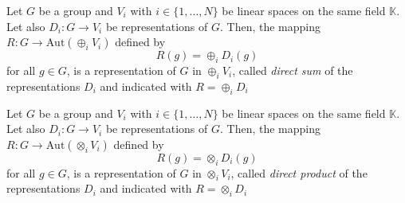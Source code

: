 \begin{proposition}
    Let $G$ be a group and $V_i$ with $i \in \{1, \ldots, N\}$ be linear spaces on the same field $\mathbb{K}$. Let also $D_i: G \rightarrow V_i$ be representations of $G$.
    Then, the mapping $R: G \rightarrow \text{Aut}(\oplus_i V_i)$ defined by
    \begin{equation*}
        R(g) = \oplus_i D_i(g)
    \end{equation*}
    for all $g \in G$, is a representation of $G$ in $\oplus_i V_i$, called \emph{direct sum} of the representations $D_i$ and indicated with $R = \oplus_i D_i$
\end{proposition}


\begin{proposition}
    Let $G$ be a group and $V_i$ with $i \in \{1, \ldots, N\}$ be linear spaces on the same field $\mathbb{K}$. Let also $D_i: G \rightarrow V_i$ be representations of $G$.
    Then, the mapping $R: G \rightarrow \text{Aut}(\otimes_i V_i)$ defined by
    \begin{equation*}
        R(g) = \otimes_i D_i(g)
    \end{equation*}
    for all $g \in G$, is a representation of $G$ in $\otimes_i V_i$, called \emph{direct product} of the representations $D_i$ and indicated with $R = \otimes_i D_i$
\end{proposition}